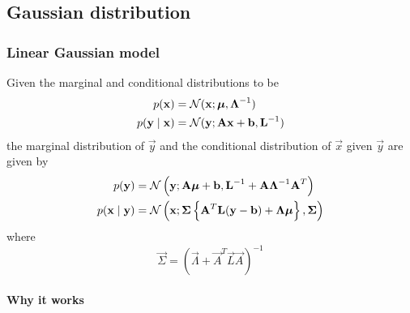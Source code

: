 \subsection{Gaussian distribution}
\subsubsection{Linear Gaussian model}
\label{ssec:prob-gaussian-lingauss}
Given the marginal and conditional distributions to be
\begin{align}
    p(\vec x)               &= \Gauss(\vec x; \vec \mu, \vec \Lambda^{-1}) \label{eqn:prob-gaussian-lingauss1} \\
    p(\vec y \mid \vec x)   &= \Gauss(\vec y; \vec A \vec x + \vec b, \vec L^{-1}) \label{eqn:prob-gaussian-lingauss2}
\end{align}
the marginal distribution of $\vec y$ and the conditional distribution of $\vec x$ given $\vec y$ are given by
\begin{align}
    p(\vec y)               &= \Gauss\left(\vec y; \vec A \vec \mu + \vec b, \vec L^{-1} + \vec A \vec \Lambda^{-1} \vec A^T\right) \label{eqn:prob-gaussian-lingauss3}\\
    p(\vec x \mid \vec y)   &= \Gauss\left(\vec x; \vec \Sigma\left\{\vec A^T \vec L(\vec y - \vec b) + \vec \Lambda \vec \mu\right\}, \vec \Sigma\right) \label{eqn:prob-gaussian-lingauss4}
\end{align}
where
\begin{equation}
    \vec \Sigma = \left(\vec \Lambda + \vec A^T \vec L \vec A \right)^{-1} \label{eqn:prob-gaussian-lingauss5}
\end{equation}

\paragraph{Why it works}